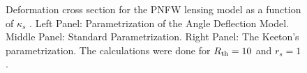 \begin{figure}[!ht]
{}
\caption{\label{dcs_pnfw_ks} Deformation cross section for the  PNFW lensing
model as a function of $\kappa_s$ . Left Panel:
Parametrization of the Angle Deflection Model. Middle Panel: Standard
Parametrization. Right Panel: The Keeton's parametrization.  The calculations
were done for $R_{\rm th}=10$ and $r_s=1$.}
\end{figure}

